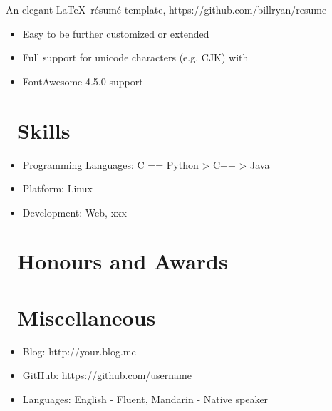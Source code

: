 \documentclass{resume}
\begin{document}
An elegant \LaTeX\ résumé template, https://github.com/billryan/resume
\begin{itemize}
  \item Easy to be further customized or extended
  \item Full support for unicode characters (e.g. CJK) with \XeLaTeX\
  \item FontAwesome 4.5.0 support
\end{itemize}

\section{\faCogs\ Skills}
\begin{itemize}[parsep=0.5ex]
  \item Programming Languages: C == Python > C++ > Java
  \item Platform: Linux
  \item Development: Web, xxx
\end{itemize}

\section{\faHeartO\ Honours and Awards}

\section{\faInfo\ Miscellaneous}
\begin{itemize}[parsep=0.5ex]
  \item Blog: http://your.blog.me
  \item GitHub: https://github.com/username
  \item Languages: English - Fluent, Mandarin - Native speaker
\end{itemize}

%
%
\end{document}
